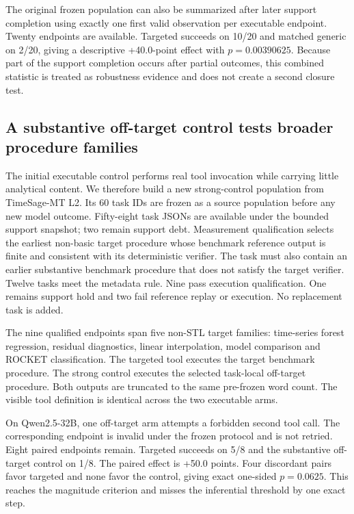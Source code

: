 The original frozen population can also be summarized after later support completion using exactly one first valid observation per executable endpoint. Twenty endpoints are available. Targeted succeeds on 10/20 and matched generic on 2/20, giving a descriptive +40.0-point effect with $p=0.00390625$. Because part of the support completion occurs after partial outcomes, this combined statistic is treated as robustness evidence and does not create a second closure test.

\subsection{A substantive off-target control tests broader procedure families}
The initial executable control performs real tool invocation while carrying little analytical content. We therefore build a new strong-control population from TimeSage-MT L2. Its 60 task IDs are frozen as a source population before any new model outcome. Fifty-eight task JSONs are available under the bounded support snapshot; two remain support debt. Measurement qualification selects the earliest non-basic target procedure whose benchmark reference output is finite and consistent with its deterministic verifier. The task must also contain an earlier substantive benchmark procedure that does not satisfy the target verifier. Twelve tasks meet the metadata rule. Nine pass execution qualification. One remains support hold and two fail reference replay or execution. No replacement task is added.

The nine qualified endpoints span five non-STL target families: time-series forest regression, residual diagnostics, linear interpolation, model comparison and ROCKET classification. The targeted tool executes the target benchmark procedure. The strong control executes the selected task-local off-target procedure. Both outputs are truncated to the same pre-frozen word count. The visible tool definition is identical across the two executable arms.

On Qwen2.5-32B, one off-target arm attempts a forbidden second tool call. The corresponding endpoint is invalid under the frozen protocol and is not retried. Eight paired endpoints remain. Targeted succeeds on 5/8 and the substantive off-target control on 1/8. The paired effect is +50.0 points. Four discordant pairs favor targeted and none favor the control, giving exact one-sided $p=0.0625$. This reaches the magnitude criterion and misses the inferential threshold by one exact step.

